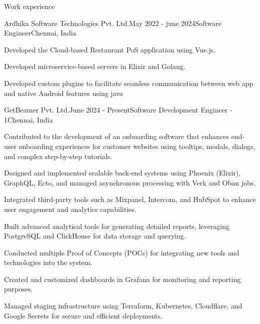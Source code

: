 \documentclass{resume} %
\begin{document}

\begin{rSection}{Work experience}

    \begin{rSubsection}{Ardhika Software Technologies Pvt. Ltd.}{May 2022 - june 2024}{Software Engineer}{Chennai, India}
        \item Developed the Cloud-based Restaurant PoS application using Vue.js.
        \item Developed microservice-based servers in Elixir and Golang.
        \item Developed custom plugins to facilitate seamless communication between web app and native Android features using java
    \end{rSubsection}

    \begin{rSubsection}{GetBeamer Pvt. Ltd.}{June 2024 - Present}{Software Development Engineer - 1}{Chennai, India}
        \item Contributed to the development of an onboarding software that enhances end-user onboarding experiences for customer websites using tooltips, modals, dialogs, and complex step-by-step tutorials.
        \item Designed and implemented scalable back-end systems using Phoenix (Elixir), GraphQL, Ecto, and managed asynchronous processing with Verk and Oban jobs.
        \item Integrated third-party tools such as Mixpanel, Intercom, and HubSpot to enhance user engagement and analytics capabilities.
        \item Built advanced analytical tools for generating detailed reports, leveraging PostgreSQL and ClickHouse for data storage and querying.
        \item Conducted multiple Proof of Concepts (POCs) for integrating new tools and technologies into the system.
        \item Created and customized dashboards in Grafana for monitoring and reporting purposes.
        \item Managed staging infrastructure using Terraform, Kubernetes, Cloudflare, and Google Secrets for secure and efficient deployments.
\end{rSubsection}


\end{rSection}
\end{document}
